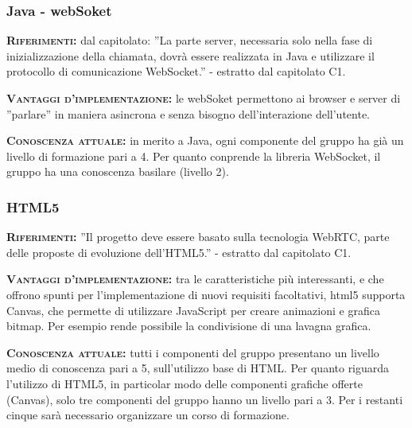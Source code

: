 \subsubsection{Java - webSoket}
\begin{description}
	\item{\scshape\bfseries Riferimenti:} dal capitolato: ''La parte server, necessaria solo nella fase di inizializzazione della chiamata, dovrà essere realizzata in Java e utilizzare il protocollo di comunicazione WebSocket.'' - estratto dal capitolato C1.
	
	\item{\scshape\bfseries Vantaggi d'implementazione:} le webSoket permettono ai browser e server di ''parlare'' in maniera asincrona e senza bisogno dell'interazione dell'utente.

	\item{\scshape\bfseries Conoscenza attuale:} in merito a Java, ogni componente del gruppo ha già un livello di formazione pari a 4. Per quanto conprende la libreria  WebSocket, il gruppo ha una conoscenza basilare (livello 2).  
\end{description}

\subsubsection{HTML5}
\begin{description}
	\item{\scshape\bfseries Riferimenti:} ''Il progetto deve essere basato sulla tecnologia WebRTC, parte delle proposte di evoluzione dell'HTML5.'' - estratto dal capitolato C1.
	
	\item{\scshape\bfseries Vantaggi d'implementazione:} tra le caratteristiche più interessanti, e che offrono spunti per l'implementazione di nuovi requisiti facoltativi, html5 supporta Canvas, che permette di utilizzare JavaScript per creare animazioni e grafica bitmap. Per esempio rende possibile la condivisione di una lavagna grafica.
	
	\item{\scshape\bfseries Conoscenza attuale:} tutti i componenti del gruppo presentano un livello medio di conoscenza pari a 5, sull'utilizzo base di HTML. Per quanto riguarda l'utilizzo di HTML5, in particolar modo delle componenti grafiche offerte (Canvas), solo tre componenti del gruppo hanno un livello pari a 3. Per i restanti cinque sarà necessario organizzare un corso di formazione.
\end{description}

